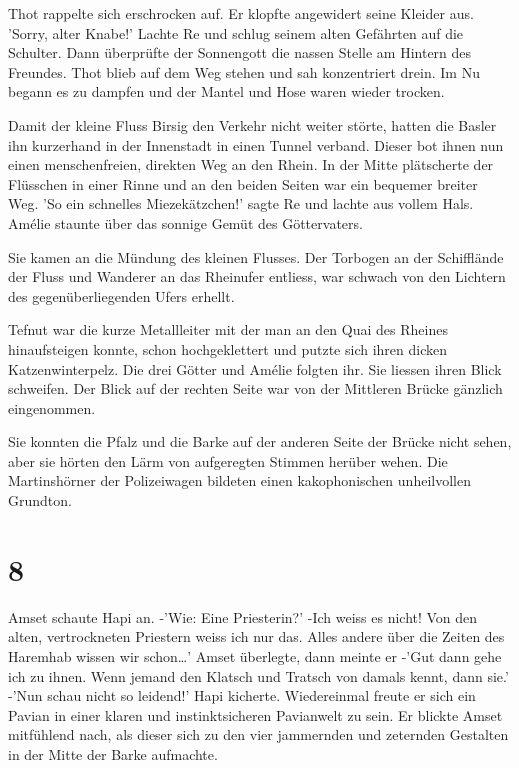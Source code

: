 \documentclass[11pt,titlepage,a5paper]{book}
\begin{document}
Thot rappelte sich erschrocken auf. Er klopfte angewidert seine Kleider aus. 'Sorry, alter Knabe!' Lachte Re und schlug seinem alten Gefährten auf die Schulter. Dann überprüfte der Sonnengott die nassen Stelle am Hintern des Freundes. Thot blieb auf dem Weg stehen und sah konzentriert drein. Im Nu begann es zu dampfen und der Mantel und Hose waren wieder trocken.

Damit der kleine Fluss Birsig den Verkehr nicht weiter störte, hatten die Basler ihn kurzerhand in der Innenstadt in einen Tunnel verband. Dieser bot ihnen nun einen menschenfreien, direkten Weg an den Rhein. In der Mitte plätscherte der Flüsschen in einer Rinne und an den beiden Seiten war ein bequemer breiter Weg. 'So ein schnelles Miezekätzchen!' sagte Re und lachte aus vollem Hals. Amélie staunte über das sonnige Gemüt des Göttervaters. 

Sie kamen an die Mündung des kleinen Flusses. Der Torbogen an der Schifflände der Fluss und Wanderer an das Rheinufer entliess, war schwach von den Lichtern des gegenüberliegenden Ufers erhellt.

Tefnut war die kurze Metallleiter mit der man an den Quai des Rheines hinaufsteigen konnte, schon hochgeklettert und putzte sich ihren dicken Katzenwinterpelz. Die drei Götter und Amélie folgten ihr. Sie liessen ihren Blick schweifen. Der Blick auf der rechten Seite war von der Mittleren Brücke gänzlich eingenommen.

Sie konnten die Pfalz und die Barke auf der anderen Seite der Brücke nicht sehen, aber sie hörten den Lärm von aufgeregten Stimmen herüber wehen. Die Martinshörner der Polizeiwagen bildeten einen kakophonischen unheilvollen Grundton. 


\section*{8}


Amset schaute Hapi an. -'Wie: Eine Priesterin?' -Ich weiss es nicht! Von den alten, vertrockneten Priestern weiss ich nur das. Alles andere über die Zeiten des Haremhab wissen wir schon\dots' Amset überlegte, dann meinte er -'Gut dann gehe ich zu ihnen. Wenn jemand den Klatsch und Tratsch von damals kennt, dann sie.' -'Nun schau nicht so leidend!' Hapi kicherte. Wiedereinmal freute er sich ein Pavian in einer klaren und instinktsicheren Pavianwelt zu sein. Er blickte Amset mitfühlend nach, als dieser sich zu den vier jammernden und zeternden Gestalten in der Mitte der Barke aufmachte.
\end{document}
